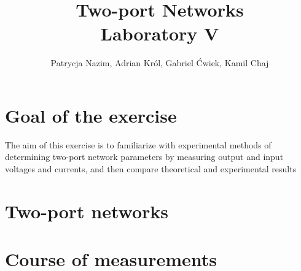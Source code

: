 \documentclass[notitlepage, a4paper, 11pt]{article}
\title{Two-port Networks\\
	\large Laboratory V}
\author{Patrycja Nazim, Adrian Król, Gabriel Ćwiek, Kamil Chaj}
\date{}
\begin{document}
	\maketitle
	\section{Goal of the exercise}
	The aim of this exercise is to familiarize with experimental methods of determining two-port network parameters by measuring output and input voltages and currents, and then compare theoretical and experimental results
	\section{Two-port networks}
	\section{Course of measurements}
\end{document}
